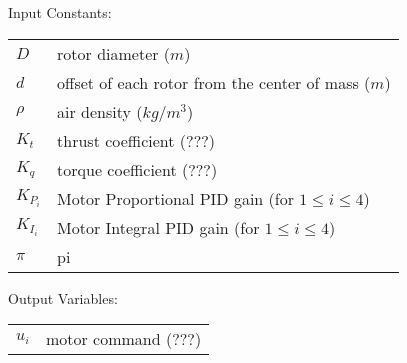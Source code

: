 \documentclass{article}
\numberwithin{equation}{section} %
\begin{document}
\bigskip
Input Constants:
\begin{tabular}{l l}
 	$ D $ 					& rotor diameter ($m$) \\
 	$ d $					& offset of each rotor from the center of mass ($m$) \\
 	$ \rho $				& air density ($kg/m^3$) \\
 	$ K_t $					& thrust coefficient ($???$) \\
 	$ K_q $					& torque coefficient ($???$) \\
 	$ K_{P_i} $				& Motor Proportional PID gain (for $1 \leq i \leq 4$) \\
 	$ K_{I_i} $				& Motor Integral PID gain (for $1 \leq i \leq 4$) \\
 	$ \pi $					& pi \\
\end{tabular}

\bigskip
Output Variables:
\begin{tabular}{l l}
 	$ u_i $					& motor command ($???$) \\
\end{tabular}


\end{document}
